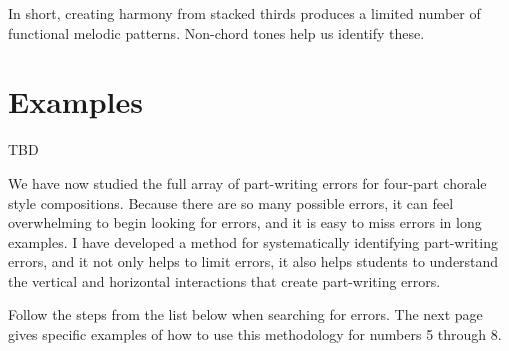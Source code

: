 \documentclass{book}
\begin{document}
In short, creating harmony from stacked thirds produces a limited number of
functional melodic patterns. Non-chord tones help us identify these.

\hypertarget{examples-2}{%
\section{Examples}\label{examples-2}}

TBD

We have now studied the full array of part-writing errors for four-part
chorale style compositions. Because there are so many possible errors, it can
feel overwhelming to begin looking for errors, and it is easy to miss errors
in long examples. I have developed a method for systematically identifying
part-writing errors, and it not only helps to limit errors, it also helps
students to understand the vertical and horizontal interactions that create
part-writing errors.

Follow the steps from the list below when searching for errors. The next page
gives specific examples of how to use this methodology for numbers 5 through
8.
\end{document}
